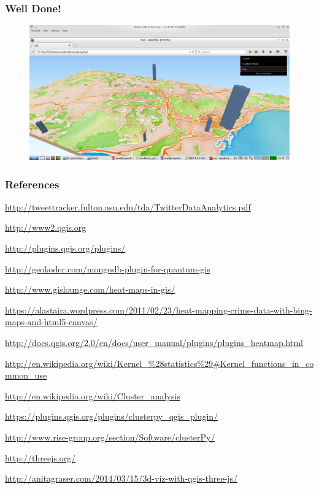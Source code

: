 \documentclass[hyperref={pdfpagelabels=true}]{beamer}
\begin{document}

\begin{frame}
\frametitle{Well Done!}
    \begin{figure}  
      \includegraphics[width=\textwidth]{final.png}    
     \end{figure}  
\end{frame}


\begin{frame}
\frametitle{References}
\begin{itemize}\tiny{
\item \url{http://tweettracker.fulton.asu.edu/tda/TwitterDataAnalytics.pdf}
\item \url{http://www2.qgis.org}
\item \url{http://plugins.qgis.org/plugins/}
\item \url{http://geokoder.com/mongodb-plugin-for-quantum-gis}
\item \url{http://www.gislounge.com/heat-maps-in-gis/}
\item \url{https://alastaira.wordpress.com/2011/02/23/heat-mapping-crime-data-with-bing-maps-and-html5-canvas/}
\item \url{http://docs.qgis.org/2.0/en/docs/user_manual/plugins/plugins_heatmap.html}
\item \url{http://en.wikipedia.org/wiki/Kernel_\%28statistics\%29\#Kernel\_functions\_in\_common\_use}
\item \url{http://en.wikipedia.org/wiki/Cluster_analysis}
\item \url{https://plugins.qgis.org/plugins/clusterpy_qgis_plugin/}
\item \url{http://www.rise-group.org/section/Software/clusterPy/}
\item \url{http://threejs.org/}
\item \url{http://anitagraser.com/2014/03/15/3d-viz-with-qgis-three-js/} }
\end{itemize}
\end{frame}

\
\end{document}
